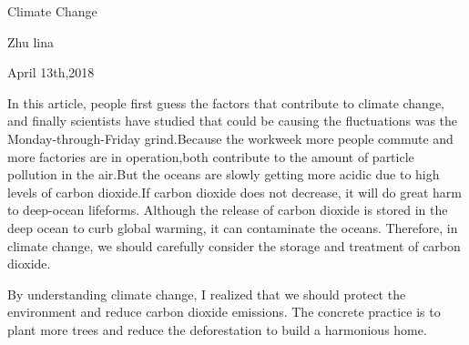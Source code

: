 \documentclass{article}
\begin{document}
                                     	\begin{center} 
                                  Climate Change\\  
                                        \end{center}               
                     
                                         \begin{center} 
                                         	Zhu lina\\
                                         	\end{center}
                                           \begin{center} 
                                             April 13th,2018\\
                                           \end{center}
      \par  In this article, people first guess the factors that contribute to climate change, and finally scientists have studied that could be causing the fluctuations was the Monday-through-Friday grind.Because the workweek more people commute and more factories are in operation,both contribute to the amount of particle pollution in the air.But the oceans are slowly getting more acidic due to high levels of carbon dioxide.If carbon dioxide does not decrease, it will do great harm to deep-ocean lifeforms. Although the release of carbon dioxide is stored in the deep ocean to curb global warming, it can contaminate the oceans. Therefore, in climate change, we should carefully consider the storage and treatment of carbon dioxide.
      \par By understanding climate change, I realized that we should protect the environment and reduce carbon dioxide emissions. The concrete practice is to plant more trees and reduce the deforestation to build a harmonious home.
\end{document}
